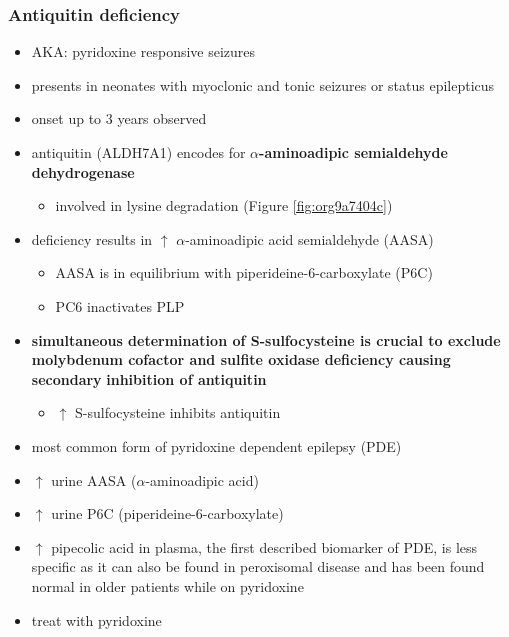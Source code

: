 \documentclass[12pt]{scrartcl}
\begin{document}
\subsubsection{Antiquitin deficiency}
\label{sec:orgebf3f10}
\begin{itemize}
\item AKA: pyridoxine responsive seizures
\item presents in neonates with myoclonic and tonic seizures or
status epilepticus
\item onset up to 3 years observed
\item antiquitin (ALDH7A1) encodes for \textbf{\(\alpha\)-aminoadipic semialdehyde dehydrogenase}
\begin{itemize}
\item involved in lysine degradation (Figure \ref{fig:org9a7404c})
\end{itemize}
\end{itemize}
\begin{itemize}
\item deficiency results in \(\uparrow\) \(\alpha\)-aminoadipic acid semialdehyde (AASA)
\begin{itemize}
\item AASA is in equilibrium with piperideine-6-carboxylate (P6C)
\item PC6 inactivates PLP
\end{itemize}
\end{itemize}
\begin{itemize}
\item \textbf{simultaneous determination of S-sulfocysteine is crucial to exclude}
\textbf{molybdenum cofactor and sulfite oxidase deficiency causing secondary}
\textbf{inhibition of antiquitin}
\begin{itemize}
\item \(\uparrow\) S-sulfocysteine inhibits antiquitin
\end{itemize}
\item most common form of pyridoxine dependent epilepsy (PDE)
\item \(\uparrow\) urine AASA (\(\alpha\)-aminoadipic acid)
\item \(\uparrow\) urine P6C (piperideine-6-carboxylate)
\item \(\uparrow\) pipecolic acid in plasma, the first described biomarker of PDE, is
less specific as it can also be found in peroxisomal disease and has
been found normal in older patients while on pyridoxine
\item treat with pyridoxine
\end{itemize}
\end{document}
